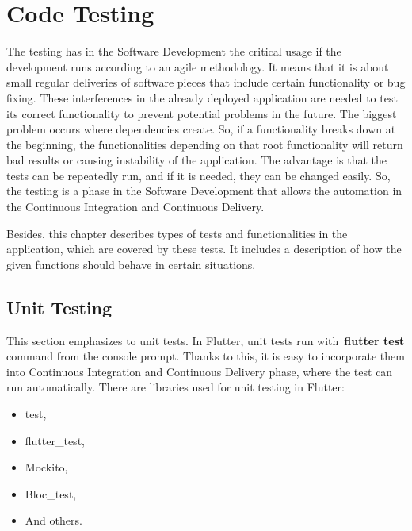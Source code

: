 \section{Code Testing}\label{sec:code-testing}
The testing has in the Software Development the critical usage if the development runs according to an agile methodology.
It means that it is about small regular deliveries of software pieces that include certain functionality or bug fixing.
These interferences in the already deployed application are needed to test its correct functionality to prevent potential problems in the future.
The biggest problem occurs where dependencies create.
So, if a functionality breaks down at the beginning, the functionalities depending on that root functionality will return bad results or causing instability of the application.
The advantage is that the tests can be repeatedly run, and if it is needed, they can be changed easily.
So, the testing is a phase in the Software Development that allows the automation in the Continuous Integration and Continuous Delivery.

Besides, this chapter describes types of tests and functionalities in the application, which are covered by these tests.
It includes a description of how the given functions should behave in certain situations.


\subsection{Unit Testing}\label{subsec:unit-testing}
This section emphasizes to unit tests.
In Flutter, unit tests run with~\textbf{flutter test} command from the console prompt.
Thanks to this, it is easy to incorporate them into Continuous Integration and Continuous Delivery phase, where the test can run automatically.
There are libraries used for unit testing in Flutter:
\begin{itemize}
    \item test,
    \item flutter\_test,
    \item Mockito,
    \item Bloc\_test,
    \item And others.
\end{itemize}

